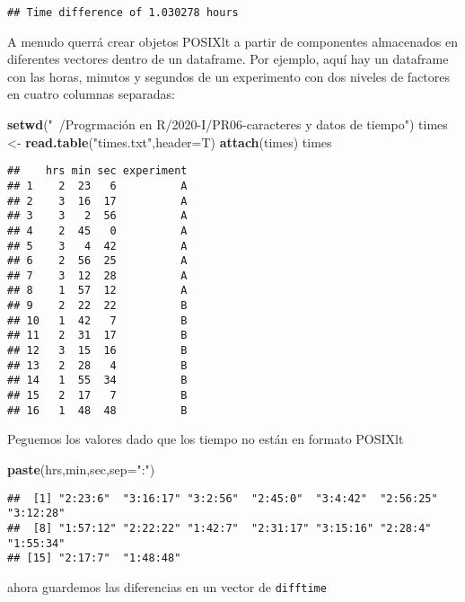 \documentclass[]{article}
\newenvironment{Shaded}{\begin{snugshade}}{\end{snugshade}}
\newcommand{\KeywordTok}[1]{\textcolor[rgb]{0.13,0.29,0.53}{\textbf{#1}}}
\newcommand{\DataTypeTok}[1]{\textcolor[rgb]{0.13,0.29,0.53}{#1}}
\newcommand{\StringTok}[1]{\textcolor[rgb]{0.31,0.60,0.02}{#1}}
\newcommand{\NormalTok}[1]{#1}
\begin{document}
\begin{verbatim}
## Time difference of 1.030278 hours
\end{verbatim}

A menudo querrá crear objetos POSIXlt a partir de componentes
almacenados en diferentes vectores dentro de un dataframe. Por ejemplo,
aquí hay un dataframe con las horas, minutos y segundos de un
experimento con dos niveles de factores en cuatro columnas separadas:

\begin{Shaded}
\begin{Highlighting}[]
\KeywordTok{setwd}\NormalTok{(}\StringTok{"~/Progrmación en R/2020-I/PR06-caracteres y datos de tiempo"}\NormalTok{)}
\NormalTok{times <-}\StringTok{ }\KeywordTok{read.table}\NormalTok{(}\StringTok{"times.txt"}\NormalTok{,}\DataTypeTok{header=}\NormalTok{T)}
\KeywordTok{attach}\NormalTok{(times)}
\NormalTok{times}
\end{Highlighting}
\end{Shaded}

\begin{verbatim}
##    hrs min sec experiment
## 1    2  23   6          A
## 2    3  16  17          A
## 3    3   2  56          A
## 4    2  45   0          A
## 5    3   4  42          A
## 6    2  56  25          A
## 7    3  12  28          A
## 8    1  57  12          A
## 9    2  22  22          B
## 10   1  42   7          B
## 11   2  31  17          B
## 12   3  15  16          B
## 13   2  28   4          B
## 14   1  55  34          B
## 15   2  17   7          B
## 16   1  48  48          B
\end{verbatim}

Peguemos los valores dado que los tiempo no están en formato POSIXlt

\begin{Shaded}
\begin{Highlighting}[]
\KeywordTok{paste}\NormalTok{(hrs,min,sec,}\DataTypeTok{sep=}\StringTok{":"}\NormalTok{)}
\end{Highlighting}
\end{Shaded}

\begin{verbatim}
##  [1] "2:23:6"  "3:16:17" "3:2:56"  "2:45:0"  "3:4:42"  "2:56:25" "3:12:28"
##  [8] "1:57:12" "2:22:22" "1:42:7"  "2:31:17" "3:15:16" "2:28:4"  "1:55:34"
## [15] "2:17:7"  "1:48:48"
\end{verbatim}

ahora guardemos las diferencias en un vector de \texttt{difftime}
\end{document}
